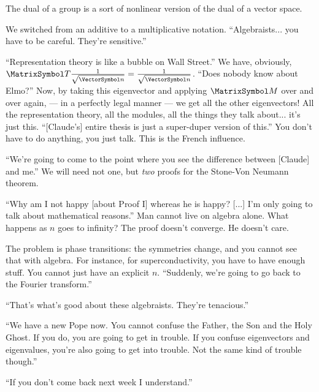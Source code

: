 \documentclass[10pt, a4paper, twoside]{lecturenotes}
\begin{document}
\begin{lecture}[date=2013-03-21, official=true]
\begingroup
\newcommand{\vsqrtninv}{\frac{1}{\sqrt{\vn}}}
The dual of a group is a sort of nonlinear version of the dual of a vector space.

We switched from an additive to a multiplicative notation. ``Algebraists... you have to be careful. They're sensitive.''

``Representation theory is like a bubble on Wall Street.'' We have, obviously, $\matT  \vsqrtninv = \vsqrtninv$. ``Does nobody know about Elmo?''  Now, by taking this eigenvector and applying $\matM$ over and over again, --- in a perfectly legal manner --- we get all the other eigenvectors! All the representation theory, all the modules, all the things they talk about... it's just this. ``[Claude's] entire thesis is just a super-duper version of this.'' You don't have to do anything, you just talk. This is the French influence.

``We're going to come to the point where you see the difference between [Claude] and me.'' We will need not one, but \emph{two} proofs for the Stone-Von Neumann theorem.

``Why am I not happy [about Proof I] whereas he is happy? [...] I'm only going to talk about mathematical reasons.'' Man cannot live on algebra alone. What happens as $n$ goes to infinity? The proof doesn't converge. He doesn't care. 

The problem is phase transitions: the symmetries change, and you cannot see that with algebra. For instance, for superconductivity, you have to have enough stuff. You cannot just have an explicit $n$. 
``Suddenly, we're going to go back to the Fourier transform.'' 

\noindent
``That's what's good about these algebraists. They're tenacious.''

``We have a new Pope now. You cannot confuse the Father, the Son and the Holy Ghost. If you do, you are going to get in trouble. If you confuse eigenvectors and eigenvalues, you're also going to get into trouble. Not the same kind of trouble though.''

``If you don't come back next week I understand.''
\endgroup
\end{lecture}
\end{document}
